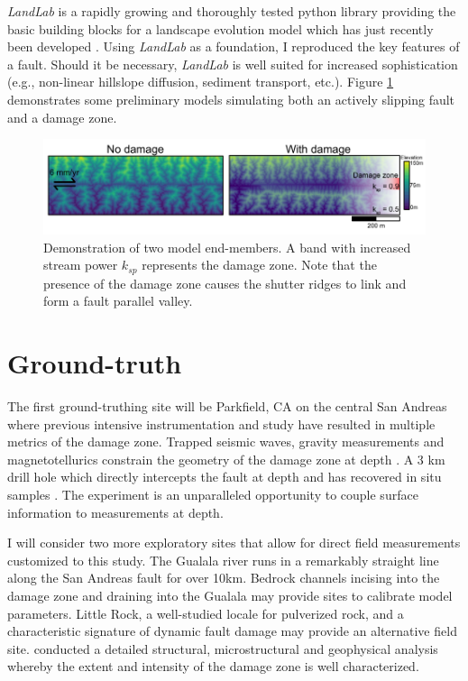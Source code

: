 \documentclass[12pt, notitlepage]{report}
\begin{document}
\textit{LandLab} is a rapidly growing and thoroughly tested python library providing the basic building blocks for a landscape evolution model which has just recently been developed \cite{Hobley2017}. Using \textit{LandLab} as a foundation, I reproduced the key features of a fault. Should it be necessary, \textit{LandLab} is well suited for increased sophistication (e.g., non-linear hillslope diffusion, sediment transport, etc.). Figure \ref{fig:model_out} demonstrates some preliminary models simulating both an actively slipping fault and a damage zone.

\begin{figure}
    \centering
    \includegraphics[scale = 1]{figures/damagezone_landscapevolution.pdf}
    \caption{Demonstration of two model end-members. A band with increased stream power $k_{sp}$ represents the damage zone. Note that the presence of the damage zone causes the shutter ridges to link and form a fault parallel valley.}
    \label{fig:model_out}
\end{figure}
 
\section{Ground-truth}

The first ground-truthing site will be Parkfield, CA on the central San Andreas where previous intensive instrumentation and study have resulted in multiple metrics of the damage zone. Trapped seismic waves, gravity measurements and magnetotellurics constrain the geometry of the damage zone at depth \cite{Thurber2003,Thurber2004Fine-scaleEarthquakes, Li1994Seismic1992}. A 3 km drill hole which directly intercepts the fault at depth and has recovered in situ samples \cite{Schleicher2006OriginCalifornia, Schleicher2009OnCalifornia}. The experiment is an unparalleled opportunity to couple surface information to measurements at depth.

I will consider two more exploratory sites that allow for direct field measurements customized to this study. The Gualala river runs in a remarkably straight line along the San Andreas fault for over 10km. Bedrock channels incising into the damage zone and draining into the Gualala may provide sites to calibrate model parameters. Little Rock, a well-studied locale for pulverized rock, and a characteristic signature of dynamic fault damage may provide an alternative field site. \textcite{Rempe2013DamageFault} conducted a detailed structural, microstructural and geophysical analysis whereby the extent and intensity of the damage zone is well characterized.
\end{document}

